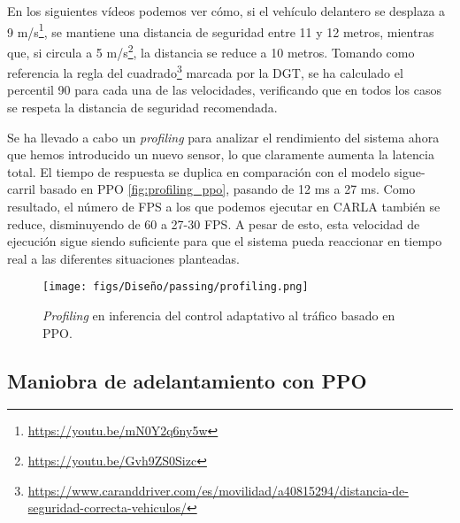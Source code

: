 En los siguientes vídeos podemos ver cómo, si el vehículo delantero se desplaza a 9 m/s\footnote{\url{https://youtu.be/mN0Y2q6ny5w}}, se mantiene una distancia de seguridad entre 11 y 12 metros, mientras que, si circula a 5 m/s\footnote{\url{https://youtu.be/Gvh9ZS0Sizc}}, la distancia se reduce a 10 metros. Tomando como referencia la regla del cuadrado\footnote{\url{https://www.caranddriver.com/es/movilidad/a40815294/distancia-de-seguridad-correcta-vehiculos/}} marcada por la \ac{DGT},  se ha calculado el percentil 90 para cada una de las velocidades, verificando que en todos los casos se respeta la distancia de seguridad recomendada.

Se ha llevado a cabo un \textit{profiling} para analizar el rendimiento del sistema ahora que hemos introducido un nuevo sensor, lo que claramente aumenta la latencia total. El tiempo de respuesta se duplica en comparación con el modelo sigue-carril basado en \ac{PPO} \ref{fig:profiling_ppo}, pasando de 12 ms a 27 ms. Como resultado, el número de \ac{FPS} a los que podemos ejecutar en CARLA también se reduce, disminuyendo de 60 a 27-30 \ac{FPS}. A pesar de esto, esta velocidad de ejecución sigue siendo suficiente para que el sistema pueda reaccionar en tiempo real a las diferentes situaciones planteadas.

\begin{figure}[ht]
\centering
\texttt{[image: figs/Diseño/passing/profiling.png]}
\caption{\textit{Profiling} en inferencia del control adaptativo al tráfico basado en \ac{PPO}.}
\label{fig:profiling_ppo_passing}
\end{figure}

\subsection{Maniobra de adelantamiento con PPO}

